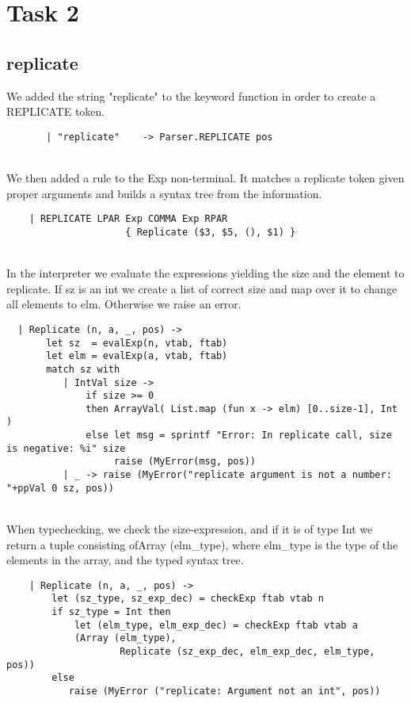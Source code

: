 \pagebreak
\section*{Task 2}

\subsection*{replicate}

We added the string "replicate" to the keyword function in order to create a REPLICATE token.
\begin{verbatim}
       | "replicate"    -> Parser.REPLICATE pos
\end{verbatim}
~\\

We then added a rule to the Exp non-terminal. It matches a replicate token given proper arguments and builds a syntax tree from the information.
\begin{verbatim}
    | REPLICATE LPAR Exp COMMA Exp RPAR
                     { Replicate ($3, $5, (), $1) } 
\end{verbatim}
~\\

In the interpreter we evaluate the expressions yielding the size and the element to replicate. If sz is an int we create a list of correct size and map over it to change all elements to elm. Otherwise we raise an error.
\begin{verbatim}
  | Replicate (n, a, _, pos) ->
       let sz  = evalExp(n, vtab, ftab)
       let elm = evalExp(a, vtab, ftab)
       match sz with
          | IntVal size ->
              if size >= 0
              then ArrayVal( List.map (fun x -> elm) [0..size-1], Int )
              else let msg = sprintf "Error: In replicate call, size is negative: %i" size
                   raise (MyError(msg, pos))
          | _ -> raise (MyError("replicate argument is not a number: "+ppVal 0 sz, pos))
\end{verbatim}
~\\

When typechecking, we check the size-expression, and if it is of type Int we return a tuple consisting ofArray (elm\_type), where elm\_type is the type of the elements in the array, and the typed syntax tree.
\begin{verbatim}
    | Replicate (n, a, _, pos) ->
        let (sz_type, sz_exp_dec) = checkExp ftab vtab n
        if sz_type = Int then
            let (elm_type, elm_exp_dec) = checkExp ftab vtab a
            (Array (elm_type), 
                    Replicate (sz_exp_dec, elm_exp_dec, elm_type, pos))
        else 
           raise (MyError ("replicate: Argument not an int", pos))
\end{verbatim}
~\\

